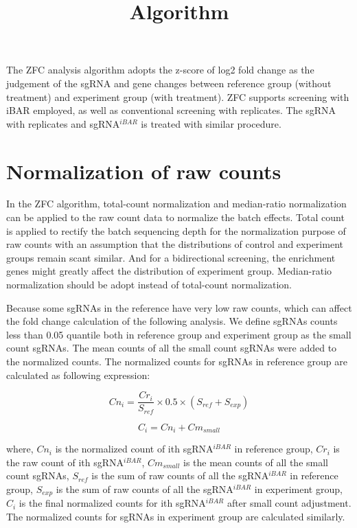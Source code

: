 \documentclass[11pt, a4paper]{article}
\title{Algorithm}
\begin{document}
\maketitle

The ZFC analysis algorithm adopts the z-score of log2 fold change as
the judgement of the sgRNA and gene changes between reference group
(without treatment) and experiment group (with treatment). ZFC
supports screening with iBAR \citep{zhu_guide_2019} employed, as
well as conventional screening with replicates. The sgRNA with
replicates and sgRNA$^{iBAR}$ is treated with similar procedure.

\section{Normalization of raw counts}

In the ZFC algorithm, total-count normalization and median-ratio
normalization can be applied to the raw count data to normalize the
batch effects. Total count is applied to rectify the batch sequencing
depth for the normalization purpose of raw counts with an assumption
that the distributions of control and experiment groups remain scant
similar. And for a bidirectional screening, the enrichment genes might
greatly affect the distribution of experiment group. Median-ratio
normalization should be adopt instead of total-count normalization.

Because some sgRNAs in the reference have very low raw counts, which
can affect the fold change calculation of the following analysis. We
define sgRNAs counts less than 0.05 quantile both in reference group
and experiment group as the small count sgRNAs. The mean counts of all
the small count sgRNAs were added to the normalized counts. The
normalized counts for sgRNAs in reference group are calculated as
following expression:

$$Cn_{i} = \frac{Cr_{i}}{S_{ref}} \times 0.5 \times (S_{ref} + S_{exp})$$

$$C_{i} = Cn_{i} + Cm_{small}$$

where, $Cn_{i}$ is the normalized count of ith sgRNA$^{iBAR}$ in
reference group, $Cr_{i}$ is the raw count of ith sgRNA$^{iBAR}$,
$Cm_{small}$ is the mean counts of all the small count sgRNAs,
$S_{ref}$ is the sum of raw counts of all the sgRNA$^{iBAR}$ in
reference group, $S_{exp}$ is the sum of raw counts of all the
sgRNA$^{iBAR}$ in experiment group, $C_{i}$ is the final normalized
counts for ith sgRNA$^{iBAR}$ after small count adjustment. The
normalized counts for sgRNAs in experiment group are calculated
similarly.
\end{document}
